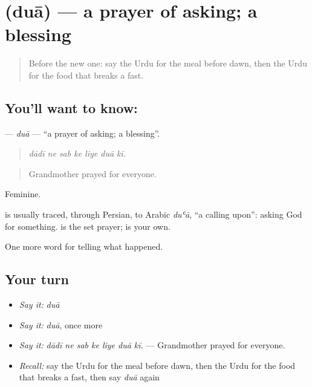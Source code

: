 \section[\texorpdfstring{\ur{دعا} (duā)}{دعا (duā)}]{ (duā) — a prayer of asking; a blessing}

\label{lesson:UR-C322-dua}



\begin{quote}
Before the new one: say the Urdu for the meal before dawn, then the Urdu for the food that breaks a fast.
\end{quote}

\subsection*{You'll want to know: }
\textbf{} — \emph{duā} — \textquotedblleft{}a prayer of asking; a blessing\textquotedblright{}.

\begin{quote}
      
\end{quote}

\begin{quote}
\emph{dādī ne sab ke liye duā kī.}
\end{quote}

\begin{quote}
Grandmother prayed for everyone.
\end{quote}

Feminine.

\begin{cousinweb}
is usually traced, through Persian, to Arabic \emph{duʿā}, \textquotedblleft{}a calling upon\textquotedblright{}: asking God for something. \textbf{} is the set prayer; \textbf{} is your own.
\end{cousinweb}

\begin{grammarlens}[title={What you've built}]
One more word for telling what happened.
\end{grammarlens}

\subsection*{Your turn}
\begin{itemize}
\raggedright
  \item \emph{Say it:} \emph{duā}
  \item \emph{Say it:} \emph{duā}, once more
  \item \emph{Say it:} \emph{dādī ne sab ke liye duā kī.} — Grandmother prayed for everyone.
  \item \emph{Recall:} say the Urdu for the meal before dawn, then the Urdu for the food that breaks a fast, then say \emph{duā} again
\end{itemize}

